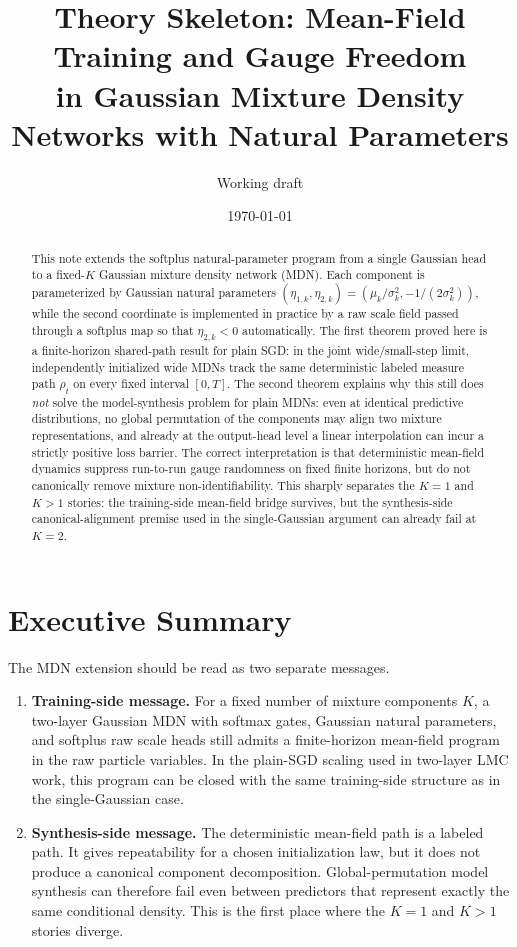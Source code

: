 \documentclass[11pt]{article}
\title{Theory Skeleton: Mean-Field Training and Gauge Freedom\\in Gaussian Mixture Density Networks with Natural Parameters}
\author{Working draft}
\date{\today}
\theoremstyle{definition}
\begin{document}
\maketitle

\begin{abstract}
This note extends the softplus natural-parameter program from a single Gaussian
head to a fixed-$K$ Gaussian mixture density network (MDN). Each component is
parameterized by Gaussian natural parameters
$(\eta_{1,k},\eta_{2,k})=(\mu_k/\sigma_k^2,-1/(2\sigma_k^2))$, while the second
coordinate is implemented in practice by a raw scale field passed through a
softplus map so that $\eta_{2,k}<0$ automatically. The first theorem proved
here is a finite-horizon shared-path result for plain SGD: in the joint
wide/small-step limit, independently initialized wide MDNs track the same
deterministic labeled measure path $\rho_t$ on every fixed interval $[0,T]$.
The second theorem explains why this still does \emph{not} solve the
model-synthesis problem for plain MDNs: even at identical predictive
distributions, no global permutation of the components may align two mixture
representations, and already at the output-head level a linear interpolation can
incur a strictly positive loss barrier. The correct interpretation is that
deterministic mean-field dynamics suppress run-to-run gauge randomness on fixed
finite horizons, but do not canonically remove mixture non-identifiability.
This sharply separates the $K=1$ and $K>1$ stories: the training-side
mean-field bridge survives, but the synthesis-side canonical-alignment premise
used in the single-Gaussian argument can already fail at $K=2$.
\end{abstract}

\section{Executive Summary}

The MDN extension should be read as two separate messages.

\begin{enumerate}[label=(\roman*)]
  \item \textbf{Training-side message.} For a fixed number of mixture
  components $K$, a two-layer Gaussian MDN with softmax gates, Gaussian natural
  parameters, and softplus raw scale heads still admits a finite-horizon
  mean-field program in the raw particle variables. In the plain-SGD
  scaling used in two-layer LMC work, this program can be closed with the same
  training-side structure as in the single-Gaussian case.
  \item \textbf{Synthesis-side message.} The deterministic mean-field path is a
  labeled path. It gives repeatability for a chosen initialization law, but it
  does not produce a canonical component decomposition. Global-permutation model
  synthesis can therefore fail even between predictors that represent exactly
  the same conditional density. This is the first place where the $K=1$ and
  $K>1$ stories diverge.
\end{enumerate}
\end{document}
